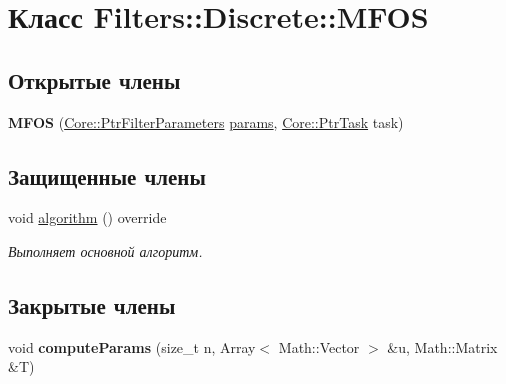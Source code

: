 \hypertarget{class_filters_1_1_discrete_1_1_m_f_o_s}{}\section{Класс Filters\+:\+:Discrete\+:\+:M\+F\+OS}
\label{class_filters_1_1_discrete_1_1_m_f_o_s}
\subsection*{Открытые члены}
\begin{DoxyCompactItemize}
\item 
\hypertarget{class_filters_1_1_discrete_1_1_m_f_o_s_a91cdbd25622c39f50c99f601aad6c238}{}\label{class_filters_1_1_discrete_1_1_m_f_o_s_a91cdbd25622c39f50c99f601aad6c238} 
{\bfseries M\+F\+OS} (\hyperlink{namespace_core_a4811af8148ba137d644b9a61a042cf03}{Core\+::\+Ptr\+Filter\+Parameters} \hyperlink{class_core_1_1_filter_a44aa749b49ba46256975ce545531ecf7}{params}, \hyperlink{namespace_core_abfda8f69fcacfcea2696549b548ed737}{Core\+::\+Ptr\+Task} task)
\end{DoxyCompactItemize}
\subsection*{Защищенные члены}
\begin{DoxyCompactItemize}
\item 
\hypertarget{class_filters_1_1_discrete_1_1_m_f_o_s_a88e35ad4500d57e81be035959ab9bb5c}{}\label{class_filters_1_1_discrete_1_1_m_f_o_s_a88e35ad4500d57e81be035959ab9bb5c} 
void \hyperlink{class_filters_1_1_discrete_1_1_m_f_o_s_a88e35ad4500d57e81be035959ab9bb5c}{algorithm} () override
\begin{DoxyCompactList}\small\item\em Выполняет основной алгоритм. \end{DoxyCompactList}\end{DoxyCompactItemize}
\subsection*{Закрытые члены}
\begin{DoxyCompactItemize}
\item 
\hypertarget{class_filters_1_1_discrete_1_1_m_f_o_s_aea8bc907d07bcb6069f9151904e25fea}{}\label{class_filters_1_1_discrete_1_1_m_f_o_s_aea8bc907d07bcb6069f9151904e25fea} 
void {\bfseries compute\+Params} (size\+\_\+t n, Array$<$ Math\+::\+Vector $>$ \&u, Math\+::\+Matrix \&T)
\end{DoxyCompactItemize}
